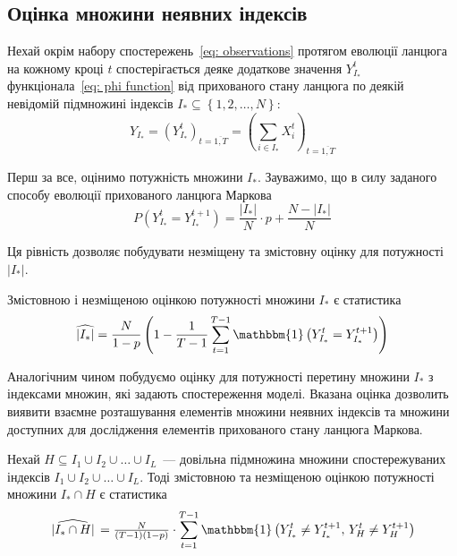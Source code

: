 \subsection{Оцінка множини неявних індексів}

Нехай окрім набору спостережень~\eqref{eq: observations} протягом еволюції ланцюга на кожному кроці $t$ спостерігається деяке додаткове значення $Y^t_{I_*}$ функціонала~\eqref{eq: phi function} від прихованого стану ланцюга по деякій невідомій підмножині індексів $I_* \subseteq \left\{ 1,2,\ldots,N \right\}:$
\begin{equation*}
    Y_{I_*} = \left( Y^t_{I_*} \right)_{t=\overline{1,T}} = \left( \sum_{i \in I_*} X^t_i \right)_{t=\overline{1,T}} 
\end{equation*}

Перш за все, оцінимо потужність множини $I_*$. Зауважимо, що в силу заданого способу еволюції прихованого ланцюга Маркова
\begin{equation*}
    P\left( Y^t_{I_*}=Y^{t+1}_{I_*} \right)=\frac{\left| I_* \right|}{N}\cdot p + \frac{N-\left| I_* \right|}{N}
\end{equation*}

Ця рівність дозволяє побудувати незміщену та змістовну оцінку для потужності $|I_*|$.

\begin{claim}
    Змістовною і незміщеною оцінкою потужності множини $I_*$ є статистика
    \begin{equation}\label{eq: ||I*|| estimation}
        \widehat{|I_*|} = \frac{N}{1-p} \left( 1-\frac{1}{T-1}\sum_{t=1}^{T-1}\mathbbm{1}\left( Y^t_{I_*}=Y^{t+1}_{I_*} \right) \right) 
    \end{equation}
\end{claim}

Аналогічним чином побудуємо оцінку для потужності перетину множини $I_*$ з індексами множин, які задають спостереження моделі. Вказана оцінка дозволить виявити взаємне розташування елементів множини неявних індексів та множини доступних для дослідження елементів прихованого стану ланцюга Маркова.

\newpage
\begin{claim}
    Нехай $H \subseteq I_1 \cup I_2 \cup \ldots \cup I_L$~--- довільна підмножина множини спостережуваних індексів $I_1 \cup I_2 \cup \ldots \cup I_L$. Тоді змістовною та незміщеною оцінкою потужності множини $I_* \cap H$ є статистика
    \begin{equation}\label{eq: ||I* cup H|| estimation}
        \widehat{\,|I_* \cap H|\,} = \tfrac{N}{(T-1)(1-p)} \cdot \sum_{t=1}^{T-1}\mathbbm{1} \left( Y^t_{I_*} \neq Y^{t+1}_{I_*},\, Y^t_H \neq Y^{t+1}_H \right)
    \end{equation}
\end{claim}

